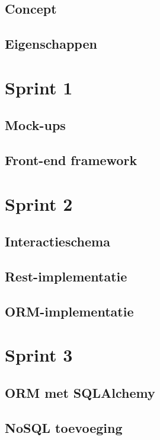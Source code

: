 \documentclass[11pt,fleqn,oneside,openany]{book} %
\begin{document}
\section{Concept}

\section{Eigenschappen}

\chapter{Sprint 1}

\section{Mock-ups}

\section{Front-end framework }

\chapter{Sprint 2}

\section{Interactieschema}

\section{Rest-implementatie}

\section{ORM-implementatie}

\chapter{Sprint 3}

\section{ORM met SQLAlchemy}

\section{NoSQL toevoeging}
\end{document}
